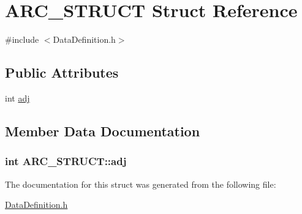 \hypertarget{structARC__STRUCT}{\section{A\-R\-C\-\_\-\-S\-T\-R\-U\-C\-T Struct Reference}
\label{structARC__STRUCT}
}


{\ttfamily \#include $<$Data\-Definition.\-h$>$}

\subsection*{Public Attributes}
\begin{DoxyCompactItemize}
\item 
int \hyperlink{structARC__STRUCT_aed399ecc75eab66d87a638f46b12fff1}{adj}
\end{DoxyCompactItemize}


\subsection{Member Data Documentation}
\hypertarget{structARC__STRUCT_aed399ecc75eab66d87a638f46b12fff1}{
\subsubsection[{adj}]{\setlength{\rightskip}{0pt plus 5cm}int A\-R\-C\-\_\-\-S\-T\-R\-U\-C\-T\-::adj}}\label{structARC__STRUCT_aed399ecc75eab66d87a638f46b12fff1}


The documentation for this struct was generated from the following file\-:\begin{DoxyCompactItemize}
\item 
\hyperlink{DataDefinition_8h}{Data\-Definition.\-h}\end{DoxyCompactItemize}
